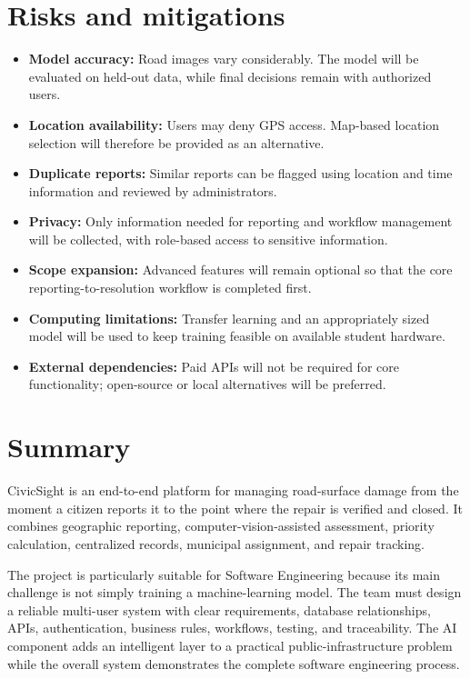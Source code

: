 \documentclass[11pt,a4paper]{article}
\begin{document}
\section{Risks and mitigations}

\begin{itemize}[leftmargin=0.6cm]

    \item \textbf{Model accuracy:} Road images vary considerably. The model will be evaluated on held-out data, while final decisions remain with authorized users.

    \item \textbf{Location availability:} Users may deny GPS access. Map-based location selection will therefore be provided as an alternative.

    \item \textbf{Duplicate reports:} Similar reports can be flagged using location and time information and reviewed by administrators.

    \item \textbf{Privacy:} Only information needed for reporting and workflow management will be collected, with role-based access to sensitive information.

    \item \textbf{Scope expansion:} Advanced features will remain optional so that the core reporting-to-resolution workflow is completed first.

    \item \textbf{Computing limitations:} Transfer learning and an appropriately sized model will be used to keep training feasible on available student hardware.

    \item \textbf{External dependencies:} Paid APIs will not be required for core functionality; open-source or local alternatives will be preferred.

\end{itemize}

\section{Summary}

CivicSight is an end-to-end platform for managing road-surface damage from the moment a citizen reports it to the point where the repair is verified and closed. It combines geographic reporting, computer-vision-assisted assessment, priority calculation, centralized records, municipal assignment, and repair tracking.

The project is particularly suitable for Software Engineering because its main challenge is not simply training a machine-learning model. The team must design a reliable multi-user system with clear requirements, database relationships, APIs, authentication, business rules, workflows, testing, and traceability. The AI component adds an intelligent layer to a practical public-infrastructure problem while the overall system demonstrates the complete software engineering process.
\end{document}

